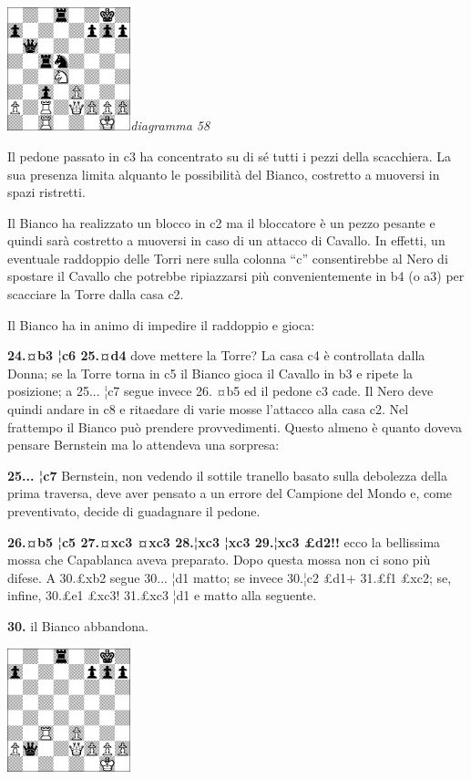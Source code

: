\documentclass[
]{article}
\begin{document}
\includegraphics[width=1.40972in,height=1.40972in]{vertopal_109f12be458a423d8f3cc838880eaea2/media/image58.png}\emph{diagramma
58}

Il pedone passato in c3 ha concentrato su di sé tutti i pezzi della
scacchiera. La sua presenza limita alquanto le possibilità del Bianco,
costretto a muoversi in spazi ristretti.

Il Bianco ha realizzato un blocco in c2 ma il bloccatore è un pezzo
pesante e quindi sarà costretto a muoversi in caso di un attacco di
Cavallo. In effetti, un eventuale raddoppio delle Torri nere sulla
colonna ``c'' consentirebbe al Nero di spostare il Cavallo che potrebbe
ripiazzarsi più convenientemente in b4 (o a3) per scacciare la Torre
dalla casa c2.

Il Bianco ha in animo di impedire il raddoppio e gioca:

\textbf{24.¤b3 ¦c6 25.¤d4} dove mettere la Torre? La casa c4 è
controllata dalla Donna; se la Torre torna in c5 il Bianco gioca il
Cavallo in b3 e ripete la posizione; a 25... ¦c7 segue invece 26. ¤b5 ed
il pedone c3 cade. Il Nero deve quindi andare in c8 e rita¢dare di varie
mosse l'attacco alla casa c2. Nel frattempo il Bianco può prendere
provvedimenti. Questo almeno è quanto doveva pensare Bernstein ma lo
attendeva una sorpresa:

\textbf{25... ¦c7} Bernstein, non vedendo il sottile tranello basato
sulla debolezza della prima traversa, deve aver pensato a un errore del
Campione del Mondo e, come preventivato, decide di guadagnare il pedone.

\textbf{26.¤b5 ¦c5 27.¤xc3 ¤xc3 28.¦xc3 ¦xc3 29.¦xc3 £d2!!} ecco la
bellissima mossa che Capablanca aveva preparato. Dopo questa mossa non
ci sono più difese. A 30.£xb2 segue 30... ¦d1 matto; se invece 30.¦c2
£d1+ 31.£f1 £xc2; se, infine, 30.£e1 £xc3! 31.£xc3 ¦d1 e matto alla
seguente.

\textbf{30.} il Bianco abbandona.

\includegraphics[width=1.40972in,height=1.40972in]{vertopal_109f12be458a423d8f3cc838880eaea2/media/image59.png}
\end{document}
